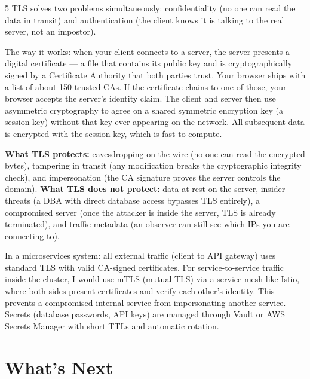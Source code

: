 \documentclass[11pt,a4paper]{article}
\begin{document}
\begin{answerbox}{5}
TLS solves two problems simultaneously: confidentiality (no one can read the data in transit) and authentication (the client knows it is talking to the real server, not an impostor).

The way it works: when your client connects to a server, the server presents a digital certificate --- a file that contains its public key and is cryptographically signed by a Certificate Authority that both parties trust. Your browser ships with a list of about 150 trusted CAs. If the certificate chains to one of those, your browser accepts the server's identity claim. The client and server then use asymmetric cryptography to agree on a shared symmetric encryption key (a session key) without that key ever appearing on the network. All subsequent data is encrypted with the session key, which is fast to compute.

\textbf{What TLS protects:} eavesdropping on the wire (no one can read the encrypted bytes), tampering in transit (any modification breaks the cryptographic integrity check), and impersonation (the CA signature proves the server controls the domain). \textbf{What TLS does not protect:} data at rest on the server, insider threats (a DBA with direct database access bypasses TLS entirely), a compromised server (once the attacker is inside the server, TLS is already terminated), and traffic metadata (an observer can still see which IPs you are connecting to).

In a microservices system: all external traffic (client to API gateway) uses standard TLS with valid CA-signed certificates. For service-to-service traffic inside the cluster, I would use mTLS (mutual TLS) via a service mesh like Istio, where both sides present certificates and verify each other's identity. This prevents a compromised internal service from impersonating another service. Secrets (database passwords, API keys) are managed through Vault or AWS Secrets Manager with short TTLs and automatic rotation.
\end{answerbox}

\newpage
\section{What's Next}
\end{document}
